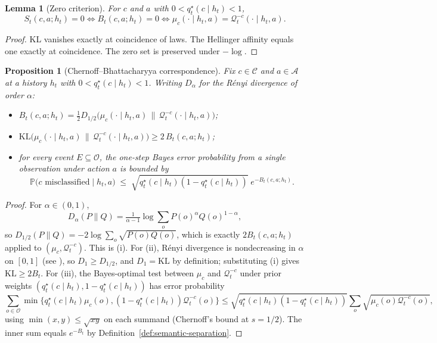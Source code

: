 \documentclass[11pt]{article}
\newtheorem{proposition}[theorem]{Proposition}
\newtheorem{lemma}[theorem]{Lemma}
\theoremstyle{definition}
\theoremstyle{remark}
\newcommand{\Acal}{\mathcal{A}}
\newcommand{\Ccal}{\mathcal{C}}
\newcommand{\Ocal}{\mathcal{O}}
\newcommand{\Qcal}{\mathcal{Q}}
\newcommand{\Prob}{\mathbb{P}}
\newcommand{\KL}{\mathrm{KL}}
\begin{document}
\begin{lemma}[Zero criterion]
\label{lem:zero-criterion}
For $c$ and $a$ with $0<q_t^\star(c\mid h_t)<1$,
\[
S_t(c,a;h_t)=0
\iff
B_t(c,a;h_t)=0
\iff
\mu_c(\cdot\mid h_t,a)=\Qcal_t^{-c}(\cdot\mid h_t,a).
\]
\end{lemma}

\begin{proof}
KL vanishes exactly at coincidence of laws. The Hellinger affinity equals one exactly at coincidence. The zero set is preserved under $-\log$.
\end{proof}

\begin{proposition}[Chernoff--Bhattacharyya correspondence]
\label{prop:chernoff-correspondence}
Fix $c\in\Ccal$ and $a\in\Acal$ at a history $h_t$ with $0<q_t^\star(c\mid h_t)<1$. Writing $D_\alpha$ for the R\'enyi divergence of order $\alpha$:
\begin{itemize}
\item[\textup{(i)}] $B_t(c,a;h_t)=\tfrac{1}{2}D_{1/2}\!\bigl(\mu_c(\cdot\mid h_t,a)\,\|\,\Qcal_t^{-c}(\cdot\mid h_t,a)\bigr)$;
\item[\textup{(ii)}] $\KL\!\bigl(\mu_c(\cdot\mid h_t,a)\,\|\,\Qcal_t^{-c}(\cdot\mid h_t,a)\bigr)\ge 2\,B_t(c,a;h_t)$;
\item[\textup{(iii)}] for every event $E\subseteq\Ocal$, the one-step Bayes error probability from a single observation under action $a$ is bounded by
\[
\Prob\!\bigl(\text{$c$ misclassified}\mid h_t,a\bigr)\;\le\;\sqrt{q_t^\star(c\mid h_t)(1-q_t^\star(c\mid h_t))}\;e^{-B_t(c,a;h_t)}.
\]
\end{itemize}
\end{proposition}

\begin{proof}
For $\alpha\in(0,1)$,
\[
D_\alpha(P\|Q)=\tfrac{1}{\alpha-1}\log\sum_o P(o)^\alpha Q(o)^{1-\alpha},
\]
so $D_{1/2}(P\|Q)=-2\log\sum_o\sqrt{P(o)Q(o)}$, which is exactly $2B_t(c,a;h_t)$ applied to $(\mu_c,\Qcal_t^{-c})$. This is (i). For (ii), R\'enyi divergence is nondecreasing in $\alpha$ on $[0,1]$ (see \citealp[Thm.~3]{vanErvenHarremoes2014}), so $D_1\ge D_{1/2}$, and $D_1=\KL$ by definition; substituting (i) gives $\KL\ge 2B_t$. For (iii), the Bayes-optimal test between $\mu_c$ and $\Qcal_t^{-c}$ under prior weights $(q_t^\star(c\mid h_t),1-q_t^\star(c\mid h_t))$ has error probability
\[
\sum_{o\in\Ocal}\min\!\bigl\{q_t^\star(c\mid h_t)\mu_c(o),(1-q_t^\star(c\mid h_t))\Qcal_t^{-c}(o)\bigr\}
\le
\sqrt{q_t^\star(c\mid h_t)(1-q_t^\star(c\mid h_t))}\sum_o\sqrt{\mu_c(o)\Qcal_t^{-c}(o)},
\]
using $\min(x,y)\le\sqrt{xy}$ on each summand (Chernoff's bound at $s=1/2$). The inner sum equals $e^{-B_t}$ by Definition~\ref{def:semantic-separation}.
\end{proof}
\end{document}
